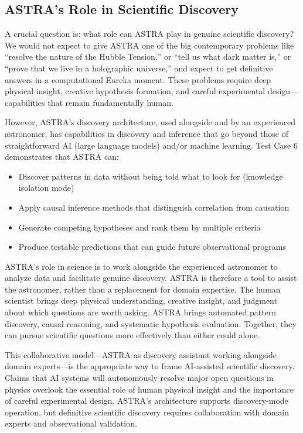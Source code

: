 \documentclass[usenatbib]{rasti}
\begin{document}
\subsection{ASTRA's Role in Scientific Discovery}

A crucial question is: what role can ASTRA play in genuine scientific discovery? We would not expect to give ASTRA one of the big contemporary problems like ``resolve the nature of the Hubble Tension,'' or ``tell us what dark matter is,'' or ``prove that we live in a holographic universe,'' and expect to get definitive answers in a computational Eureka moment. These problems require deep physical insight, creative hypothesis formation, and careful experimental design---capabilities that remain fundamentally human.

However, ASTRA's discovery architecture, used alongside and by an experienced astronomer, has capabilities in discovery and inference that go beyond those of straightforward AI (large language models) and/or machine learning. Test Case 6 demonstrates that ASTRA can:
\begin{itemize}
\item Discover patterns in data without being told what to look for (knowledge isolation mode)
\item Apply causal inference methods that distinguish correlation from causation
\item Generate competing hypotheses and rank them by multiple criteria
\item Produce testable predictions that can guide future observational programs
\end{itemize}

ASTRA's role in science is to work alongside the experienced astronomer to analyze data and facilitate genuine discovery. ASTRA is therefore a tool to assist the astronomer, rather than a replacement for domain expertise. The human scientist brings deep physical understanding, creative insight, and judgment about which questions are worth asking. ASTRA brings automated pattern discovery, causal reasoning, and systematic hypothesis evaluation. Together, they can pursue scientific questions more effectively than either could alone.

This collaborative model---ASTRA as discovery assistant working alongside domain experts---is the appropriate way to frame AI-assisted scientific discovery. Claims that AI systems will autonomously resolve major open questions in physics overlook the essential role of human physical insight and the importance of careful experimental design. ASTRA's architecture supports discovery-mode operation, but definitive scientific discovery requires collaboration with domain experts and observational validation.
\end{document}
